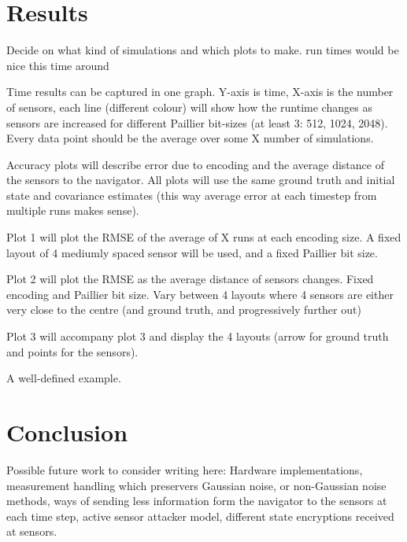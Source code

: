 \documentclass[twocolumn]{autart}
\theoremstyle{definition}
\begin{document}
\section{Results}
Decide on what kind of simulations and which plots to make. run times would be nice this time around

Time results can be captured in one graph. Y-axis is time, X-axis is the number of sensors, each line (different colour) will show how the runtime changes as sensors are increased for different Paillier bit-sizes (at least 3: 512, 1024, 2048). Every data point should be the average over some X number of simulations.

Accuracy plots will describe error due to encoding and the average distance of the sensors to the navigator. All plots will use the same ground truth and initial state and covariance estimates (this way average error at each timestep from multiple runs makes sense).

Plot 1 will plot the RMSE of the average of X runs at each encoding size. A fixed layout of 4 mediumly spaced sensor will be used, and a fixed Paillier bit size.

Plot 2 will plot the RMSE as the average distance of sensors changes. Fixed encoding and Paillier bit size. Vary between 4 layouts where 4 sensors are either very close to the centre (and ground truth, and progressively further out)

Plot 3 will accompany plot 3 and display the 4 layouts (arrow for ground truth and points for the sensors).

A well-defined example.

\section{Conclusion}
Possible future work to consider writing here:
Hardware implementations, measurement handling which preservers Gaussian noise, or non-Gaussian noise methods, ways of sending less information form the navigator to the sensors at each time step, active sensor attacker model, different state encryptions received at sensors.



\end{document}
